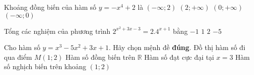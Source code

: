 \begin{ex}%
Khoảng đồng biến của hàm số $y=-x^4+2$ là
\choice
{$(-\infty;2)$}
{$(2;+\infty)$}
{$(0;+\infty)$}
{\True $(-\infty;0)$}
\end{ex}

\begin{ex}%
Tổng các nghiệm của phương trình $2^{x^2+3x-3}=2.4^{x+1}$ bằng
\choice
{\True $-1$}
{$1$}
{$2$}
{$-5$}
\end{ex}

\begin{ex}%
Cho hàm số $y=x^3-5x^2+3x+1$. Hãy chọn mệnh đề \textbf{đúng}.
\choice
{Đồ thị hàm số đi qua điểm $M(1;2)$}
{Hàm số đồng biến trên $\mathbb{R}$}
{Hàm số đạt cực đại tại $x=3$}
{\True Hàm số nghịch biến trên khoảng $(1;2)$}
\end{ex}

